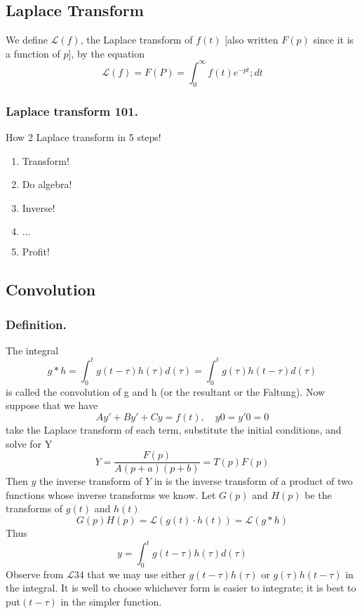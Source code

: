 \documentclass[../main.tex]{subfiles}
\begin{document}
\subsection*{Laplace Transform}
We define $\mathcal{L}(f )$, the Laplace transform of $f (t)$ [also written $F (p)$ since it is a function of $p$], by the equation
\begin{equation*}
    \mathcal{L}(f)=F(P)=\int_{0}^{\infty}f(t)e^{-pt};dt
\end{equation*}

\subsubsection*{Laplace transform 101.} How 2 Laplace transform in 5 steps!
\begin{enumerate}
    \item Transform!
    \item Do algebra!
    \item Inverse!
    \item $\dots$
    \item Profit!
\end{enumerate}

\subsection*{Convolution}
\subsubsection*{Definition.} The integral
\begin{equation*}
    g*h=\int_{0}^{t}g(t-\tau)h(\tau)d(\tau)=\int_{0}^{t}g(\tau)h(t-\tau)d(\tau)
\end{equation*}
is called the convolution of g and h (or the resultant or the Faltung). Now suppose that we have
\begin{equation*}
    Ay' + By' + Cy = f (t), \quad y0 = y'0 = 0
\end{equation*}
take the Laplace transform of each term, substitute the initial conditions, and solve for Y
\begin{equation*}
    Y=\frac{F(p)}{A(p + a)(p + b)}=T(p)F(p)
\end{equation*}
Then $y$ the inverse transform of $Y$ in is the inverse transform of a product of two functions whose inverse transforms we know. Let $G(p)$ and $H(p)$ be the transforms of $g(t)$ and $h(t)$
\begin{equation*}
    G(p)H(p)=\mathcal{L}(g(t)\cdot h(t))=\mathcal{L}(g*h)
\end{equation*} 
Thus
\begin{equation*}
    y=\int_{0}^{t}g(t-\tau)h(\tau)d(\tau)
\end{equation*}
Observe from $\mathcal{L}34$ that we may use either $g(t - \tau )h(\tau )$ or $g(\tau )h(t - \tau )$ in the integral. It is well to choose whichever form is easier to integrate; it is best to put$ (t - \tau )$ in the simpler function.
\end{document}
